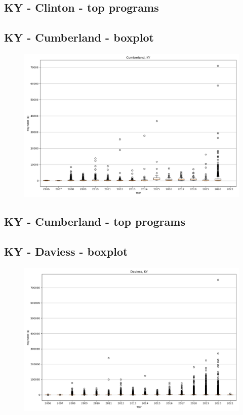 \subsection*{KY - Clinton - top programs}

\newpage
\subsection*{KY - Cumberland - boxplot}
\begin{figure}[h]
\centering
\includegraphics[width=7in]{../output/boxplots/counties/Cumberland-KY_boxplot.png}
\end{figure}


\subsection*{KY - Cumberland - top programs}

\newpage
\subsection*{KY - Daviess - boxplot}
\begin{figure}[h]
\centering
\includegraphics[width=7in]{../output/boxplots/counties/Daviess-KY_boxplot.png}
\end{figure}


